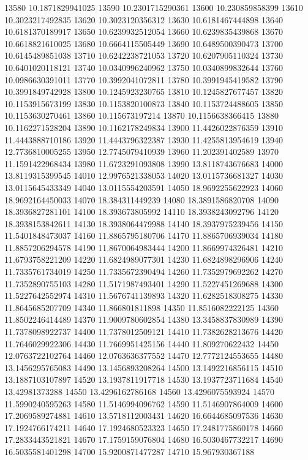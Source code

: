 {13580 10.1871829941025
13590 10.2301715290361
13600 10.230859858399
13610 10.3023217492835
13620 10.3023120356312
13630 10.6181467444898
13640 10.6181370189917
13650 10.6239932512054
13660 10.6239835439868
13670 10.6618821610025
13680 10.6664115505449
13690 10.6489500390473
13700 10.6145489851038
13710 10.6242238721053
13720 10.6207905110324
13730 10.6401020118121
13740 10.0340996240962
13750 10.0340899832644
13760 10.0986630391011
13770 10.3992041072811
13780 10.3991945419582
13790 10.3991849742928
13800 10.1245923230765
13810 10.1245827677457
13820 10.1153915673199
13830 10.1153820100873
13840 10.1153724488605
13850 10.1153630270461
13860 10.115673197214
13870 10.1156638366415
13880 10.1162271528204
13890 10.1162178249834
13900 11.4426022876359
13910 11.4443888710186
13920 11.4443796322387
13930 11.4255813954619
13940 12.7736810005255
13950 12.7745079410939
13960 11.202391402589
13970 11.1591422968434
13980 11.6723291093808
13990 13.8118743676683
14000 13.8119315399545
14010 12.9976521338053
14020 13.0115736681327
14030 13.0115645433349
14040 13.0115554203591
14050 18.9692255622923
14060 18.9692164450033
14070 18.384311449239
14080 18.3891586820708
14090 18.3936827281101
14100 18.393673805992
14110 18.3938243092796
14120 18.3938153842611
14130 18.3938064479988
14140 18.3937975239456
14150 11.5401848473037
14160 11.8865795180706
14170 11.8865706939034
14180 11.8857206294578
14190 11.8670064983444
14200 11.8669974326481
14210 11.6793758221209
14220 11.6824989077301
14230 11.6824898296906
14240 11.7335761734019
14250 11.7335672390494
14260 11.7352979692262
14270 11.7352890755103
14280 11.5171987493401
14290 11.5227451269688
14300 11.5227642552974
14310 11.5676741139893
14320 11.6282518308275
14330 11.8645685207709
14340 11.866801811898
14350 11.8516082222125
14360 11.8502246414489
14370 11.9009780602854
14380 13.3458837830989
14390 11.7378098922737
14400 11.7378012509121
14410 11.7382628213676
14420 11.7646029922306
14430 11.7669951425156
14440 11.809270622432
14450 12.0763722102764
14460 12.0763636377552
14470 12.7772124553655
14480 13.1456295765083
14490 13.1456893208264
14500 13.1492216856115
14510 13.1887103107897
14520 13.1937811917718
14530 13.1937723711684
14540 13.42981373288
14550 13.4296162786168
14560 13.4296075593924
14570 11.5990240595263
14580 11.5146994096762
14590 11.5146907864009
14600 17.2069589274881
14610 13.5718112003431
14620 16.6644685097536
14630 17.1924766174211
14640 17.1924680523323
14650 17.2481775860178
14660 17.2833443521821
14670 17.1759159076804
14680 16.5030467732217
14690 16.5035581401298
14700 15.9200871477287
14710 15.967930367188
}
